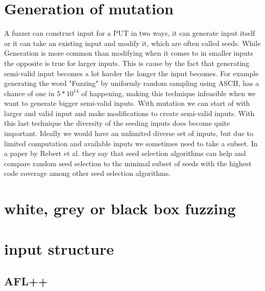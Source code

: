 \section{Generation of mutation}
A fuzzer can construct input for a PUT in two ways, it can generate input itself or it can take an existing input and modify it, which are often called seeds. While Generation is more common than modifying when it comes to in smaller inputs the opposite is true for larger inputs. This is cause by the fact that generating semi-valid input becomes a lot harder the longer the input becomes. For example generating the word "Fuzzing" by uniformly random sampling using ASCII, has a chance of one in $5*10^{14}$ of happening, making this technique infeasible when we want to generate bigger semi-valid inputs. With mutation we can start of with larger and valid input and make modifications to create semi-valid inputs. With this last technique the diversity of the seeding inputs does become quite important. Ideally we would have an unlimited diverse set of inputs, but due to limited computation and available inputs we sometimes need to take a subset. In a paper by Rebert et al. \cite{14rebert2014seedselecting} they say that seed selection algorithms can help and compare random seed selection to the minimal subset of seeds with the highest code coverage among other seed selection algorithms. 

\section{white, grey or black box fuzzing}
\section{input structure}

\subsection{AFL++}


